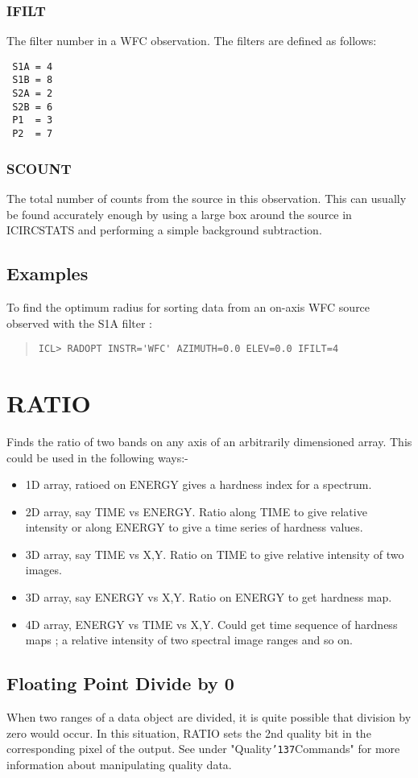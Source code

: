\documentclass{book}
\renewcommand{\_}{{\tt\char'137}}     %
\begin{document}
\subsubsection{IFILT}
The filter number in a WFC observation. The filters are defined
as follows:

\begin{verbatim}
 S1A = 4
 S1B = 8
 S2A = 2
 S2B = 6
 P1  = 3
 P2  = 7
\end{verbatim}
\subsubsection{SCOUNT}
The total number of counts from the source in this observation.
This can usually be found accurately enough by using a large box
around the source in ICIRCSTATS and performing a simple background
subtraction.

\subsection{Examples}
To find the optimum radius for sorting data from an on-axis WFC source
observed with the S1A filter :
\begin{quote}\begin{verbatim}
ICL> RADOPT INSTR='WFC' AZIMUTH=0.0 ELEV=0.0 IFILT=4
\end{verbatim}\end{quote}
\section{RATIO}
Finds the ratio of two bands on any axis of an arbitrarily
dimensioned array. This could be used in the following ways:-
\begin{itemize}
\item 1D array, ratioed on ENERGY gives a hardness index for a
spectrum.
\item 2D array, say TIME vs ENERGY. Ratio along TIME to give
relative intensity or along ENERGY to give a time series
of hardness values.
\item 3D array, say TIME vs X,Y. Ratio on TIME to give
relative intensity of two images.
\item 3D array, say ENERGY vs X,Y. Ratio on ENERGY to get
hardness map.
\item 4D array, ENERGY vs TIME vs X,Y. Could get time sequence
of hardness maps ; a relative intensity of two spectral
image ranges and so on.
\end{itemize}
\subsection{Floating Point Divide by 0}
When two ranges of a data object are divided, it is quite
possible that division by zero would occur. In this situation,
RATIO sets the 2nd quality bit in the corresponding pixel of
the output. See under "Quality\_Commands" for more information
about manipulating quality data.
\end{document}
